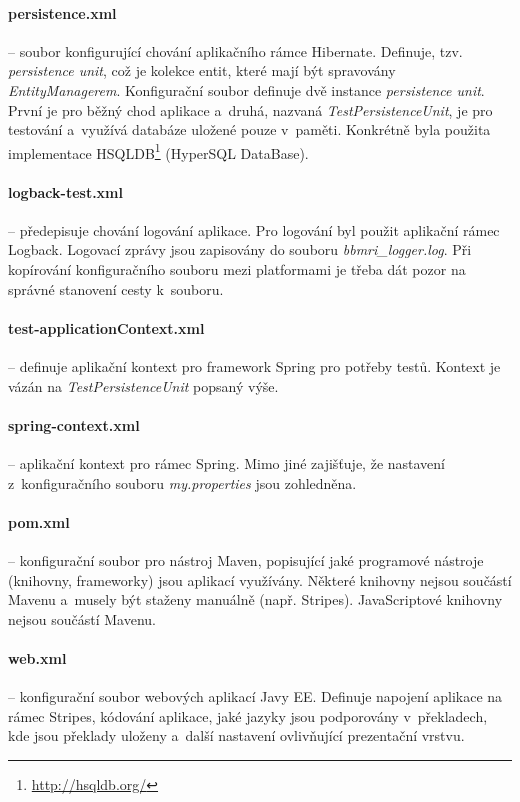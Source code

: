 \documentclass[11pt, draft, oneside]{fithesis2}
\begin{document}
\paragraph*{persistence.xml} -- soubor konfigurující chování aplikačního rámce Hibernate. Definuje, tzv. \textit{persistence unit}, což je kolekce entit, které mají být spravovány \textit{EntityManagerem}.
Konfigurační soubor definuje dvě instance \textit{persistence unit}. První je pro běžný chod aplikace a~druhá, nazvaná \textit{TestPersistenceUnit}, je pro testování a~využívá databáze uložené pouze v~paměti.
Konkrétně byla použita implementace HSQLDB\footnote{\url{http://hsqldb.org/}} (HyperSQL DataBase).

\paragraph*{logback-test.xml} -- předepisuje chování logování aplikace. Pro logování byl použit aplikační rámec Logback. Logovací zprávy jsou zapisovány do souboru \textit{bbmri\_logger.log}. Při kopírování konfiguračního souboru mezi platformami je třeba dát pozor na správné stanovení cesty k~souboru.

\paragraph*{test-applicationContext.xml} -- definuje aplikační kontext pro framework Spring pro potřeby testů. Kontext je vázán na \textit{TestPersistenceUnit} popsaný výše.

\paragraph*{spring-context.xml} -- aplikační kontext pro rámec Spring. Mimo jiné zajišťuje, že nastavení z~konfiguračního souboru \textit{my.properties} jsou zohledněna.

\paragraph*{pom.xml} -- konfigurační soubor pro nástroj Maven, popisující jaké programové nástroje (knihovny, frameworky) jsou aplikací využívány. Některé knihovny nejsou součástí Mavenu a~musely být staženy manuálně (např. Stripes). JavaScriptové knihovny nejsou součástí Mavenu.

\paragraph*{web.xml} -- konfigurační soubor webových aplikací Javy EE. Definuje napojení aplikace na rámec Stripes, kódování aplikace, jaké jazyky jsou podporovány v~překladech, kde jsou překlady uloženy a~další nastavení ovlivňující prezentační vrstvu.
\end{document}
